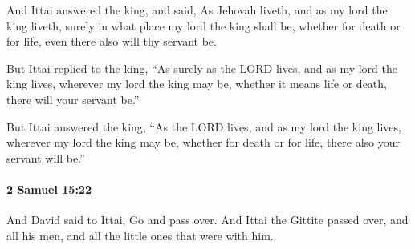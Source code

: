 			\begin{versebox}
					\item[BHS] 
					\item[ASV] And Ittai answered the king, and said, As Jehovah liveth, and as my lord the king liveth, surely in what place my lord the king shall be, whether for death or for life, even there also will thy servant be.
					\item[NIV] But Ittai replied to the king, “As surely as the LORD lives, and as my lord the king lives, wherever my lord the king may be, whether it means life or death, there will your servant be.”
					\item[NRSV] But Ittai answered the king, “As the LORD lives, and as my lord the king lives, wherever my lord the king may be, whether for death or for life, there also your servant will be.”
			\end{versebox}

		\paragraph{2 Samuel 15:22} %
			\label{2SAMUEL-15-22}

			And David said to Ittai, Go and pass over. And Ittai the Gittite passed over, and all his men, and all the little ones that were with him.

